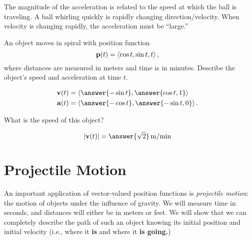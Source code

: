 \documentclass{ximera}
\begin{document}
\begin{example}
\begin{explanation}
  The magnitude of the acceleration is related to the speed at which
  the ball is traveling. A ball whirling quickly is rapidly changing
  direction/velocity. When velocity is changing rapidly, the
  acceleration must be ``large.''
\end{explanation}
\end{example}

\begin{question}
  An object moves in spiral with position function
  \[
  \mathbf{p}(t) = \left\langle \cos t, \sin t, t\right\rangle,
  \]
  where distances are measured in meters and time is in
  minutes. Describe the object's speed and acceleration at time $t$.
  \begin{prompt}
    \begin{align*}
      \vec{v}(t) &= \vector{\answer{-\sin t}, \answer{\cos t, 1}}  \\
      \vec{a}(t) &= \vector{\answer{-\cos t}, \answer{-\sin t, 0}}.
    \end{align*}
  \end{prompt}
  \begin{question}
    What is the speed of this object?
    \begin{prompt}
    \[
    |\vec{v}(t)| = \answer{\sqrt{2}}\unit{m/min}
    \]
    \end{prompt}
  \end{question}
\end{question}
              
\section{Projectile Motion}

An important application of vector-valued position functions is
\textit{projectile motion}: the motion of objects under the influence
of gravity. We will measure time in seconds, and distances will either
be in meters or feet. We will show that we can completely describe the
path of such an object knowing its initial position and initial
velocity (i.e., where it \textbf{is} and where it \textbf{is going.})
\end{document}
